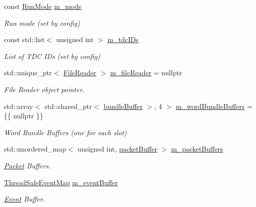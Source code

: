 \begin{DoxyCompactItemize}
\item 
const \hyperlink{_modes_enum_8hpp_a3dfe11cf1a3a8121f6cd7fec4bf5947e}{Run\+Mode} \hyperlink{class_processor_ac22f412163181f546d847ce23d71978d}{m\+\_\+mode}
\begin{DoxyCompactList}\small\item\em Run mode (set by config) \end{DoxyCompactList}\item 
const std\+::list$<$ unsigned int $>$ \hyperlink{class_processor_a8eaa993665bf2a2ed71f84ffc0630574}{m\+\_\+tdc\+I\+Ds}
\begin{DoxyCompactList}\small\item\em List of T\+DC I\+Ds (set by config) \end{DoxyCompactList}\item 
std\+::unique\+\_\+ptr$<$ \hyperlink{class_file_reader}{File\+Reader} $>$ \hyperlink{class_processor_aafe2ae55e609005c0e88226f1dd1dcb5}{m\+\_\+file\+Reader} = nullptr
\begin{DoxyCompactList}\small\item\em File Reader object pointer. \end{DoxyCompactList}\item 
std\+::array$<$ std\+::shared\+\_\+ptr$<$ \hyperlink{class_processor_a531b4c5f7c0d810fc6e9e1dd3d115725}{bundle\+Buffer} $>$, 4 $>$ \hyperlink{class_processor_a8277cf1524daaa16f0dacfddd02ffd13}{m\+\_\+word\+Bundle\+Buffers} = \{\{ nullptr \}\}
\begin{DoxyCompactList}\small\item\em Word Bundle Buffers (one for each slot) \end{DoxyCompactList}\item 
std\+::unordered\+\_\+map$<$ unsigned int, \hyperlink{class_processor_a0cfd8ed0721769db91c142a19a392e0f}{packet\+Buffer} $>$ \hyperlink{class_processor_ab75c789ec03e38e8621f000332daa285}{m\+\_\+packet\+Buffers}
\begin{DoxyCompactList}\small\item\em \hyperlink{class_packet}{Packet} Buffers. \end{DoxyCompactList}\item 
\hyperlink{class_thread_safe_event_map}{Thread\+Safe\+Event\+Map} \hyperlink{class_processor_a7cb15fbab19fceb6bc5a607629ff5040}{m\+\_\+event\+Buffer}
\begin{DoxyCompactList}\small\item\em \hyperlink{class_event}{Event} Buffer. \end{DoxyCompactList}\end{DoxyCompactItemize}


